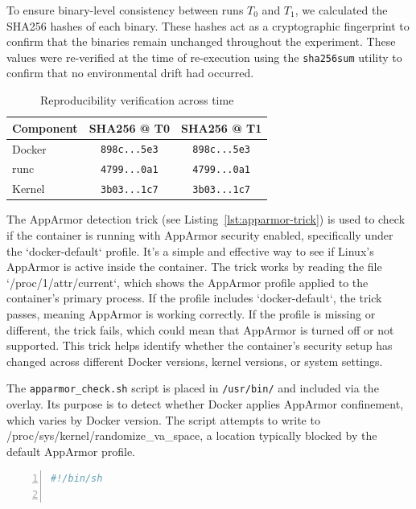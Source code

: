 \begin{doublespace}
To ensure binary-level consistency between runs \texttt{\( T_0 \)} and \texttt{\( T_1 \)}, we calculated the SHA256 hashes of each binary. These hashes act as a cryptographic fingerprint to confirm that the binaries remain unchanged throughout the experiment. These values were re-verified at the time of re-execution using the \texttt{sha256sum} utility to confirm that no environmental drift had occurred.

\begin{table}[H]
\centering
\caption{Reproducibility verification across time}
\begin{tabular}{|l|c|c|}
\hline
\textbf{Component} & \textbf{SHA256 @ T0} & \textbf{SHA256 @ T1} \\
\hline
Docker & \texttt{898c...5e3} & \texttt{898c...5e3} \\
runc & \texttt{4799...0a1} & \texttt{4799...0a1} \\
Kernel & \texttt{3b03...1c7} & \texttt{3b03...1c7} \\
\hline
\end{tabular}
\end{table}


The AppArmor detection trick (see Listing~\ref{lst:apparmor-trick}) is used to check if the container is running with AppArmor security enabled, specifically under the `docker-default` profile. It’s a simple and effective way to see if Linux’s AppArmor is active inside the container. The trick works by reading the file `/proc/1/attr/current`, which shows the AppArmor profile applied to the container’s primary process. If the profile includes `docker-default`, the trick passes, meaning AppArmor is working correctly. If the profile is missing or different, the trick fails, which could mean that AppArmor is turned off or not supported. This trick helps identify whether the container's security setup has changed across different Docker versions, kernel versions, or system settings.

The \texttt{apparmor\_check.sh} script is placed in \texttt{/usr/bin/} and included via the overlay. Its purpose is to detect whether Docker applies AppArmor confinement, which varies by Docker version. The script attempts to write to /proc/sys/kernel/randomize\_va\_space, a location typically blocked by the default AppArmor profile.

\begin{lstlisting}[language=bash, caption={AppArmor Enforcement Trick Script}, label={lst:apparmor-trick}, numbers=left, numberstyle=\tiny, stepnumber=1, breaklines=true, frame=single, backgroundcolor=\color{gray!10}, basicstyle=\ttfamily\footnotesize, showspaces=false, showstringspaces=false]
#!/bin/sh


\end{lstlisting}
\end{doublespace}
